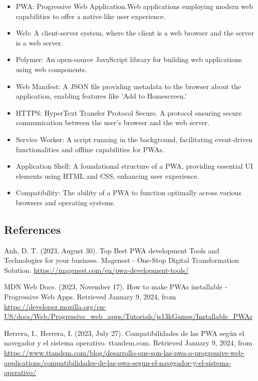 \documentclass[12pt,a4paper, twosite]{article}
\begin{document}
\begin{itemize}

\item PWA: Progressive Web Application.Web applications employing modern web capabilities to offer a native-like user experience.

\item Web: A client-server system, where the client is a web browser and the server is a web server.

\item Polymer: An open-source JavaScript library for building web applications using web components.


\item Web Manifest: A JSON file providing metadata to the browser about the application, enabling features like 'Add to Homescreen.'

\item HTTPS: HyperText Transfer Protocol Secure. A protocol ensuring secure communication between the user's browser and the web server.

\item Service Worker: A script running in the background, facilitating event-driven functionalities and offline capabilities for PWAs.

\item Application Shell: A foundational structure of a PWA, providing essential UI elements using HTML and CSS, enhancing user experience.

\item Compatibility: The ability of a PWA to function optimally across various browsers and operating systems.

\end{itemize}

\subsection{References}
\label{sec:org62711e0}


\begin{thebibliography}{9}

   Anh, D. T. (2023, August 30). Top Best PWA development Tools and Technologies for your business. Magenest - One-Stop Digital Transformation Solution. \url{https://magenest.com/en/pwa-development-tools/}

  MDN Web Docs. (2023, November 17). How to make PWAs installable - Progressive Web Apps. Retrieved January 9, 2024, from \url{https://developer.mozilla.org/en-US/docs/Web/Progressive_web_apps/Tutorials/js13kGames/Installable_PWAs}
  
  Herrera, I., Herrera, I. (2023, July 27). Compatibilidades de las PWA según el navegador y el sistema operativo. ttandem.com. Retrieved January 9, 2024, from \url{https://www.ttandem.com/blog/desarrollo-que-son-las-pwa-o-progressive-web-applications/compatibilidades-de-las-pwa-segun-el-navegador-y-el-sistema-operativo/}
  
\end{thebibliography}
\end{document}
